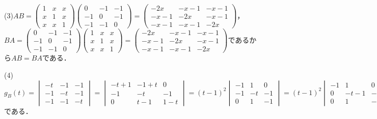 \documentclass[
		book,
		head_space=20mm,
		foot_space=20mm,
		gutter=10mm,
		line_length=190mm
]{jlreq}
\begin{document}
(3)$AB=\begin{pmatrix}
    1 & x & x \\
    x & 1 & x \\
    x & x & 1
\end{pmatrix}\begin{pmatrix}
    0 & -1 & -1 \\
    -1 & 0 & -1 \\
    -1 & -1 & 0
\end{pmatrix}= \begin{pmatrix}
    -2x & -x-1 & -x-1 \\
    -x-1 & -2x & -x-1 \\
    -x-1 & -x-1 & -2x
\end{pmatrix}$，$BA=\begin{pmatrix}
    0 & -1 & -1 \\
    -1 & 0 & -1 \\
    -1 & -1 & 0
\end{pmatrix}\begin{pmatrix}
    1 & x & x \\
    x & 1 & x \\
    x & x & 1
\end{pmatrix}= \begin{pmatrix}
    -2x & -x-1 & -x-1 \\
    -x-1 & -2x & -x-1 \\
    -x-1 & -x-1 & -2x
\end{pmatrix}$であるから$AB=BA$である．

(4)$g_B(t)=\begin{vmatrix}
    -t & -1 & -1 \\
    -1 & -t & -1 \\
    -1 & -1 & -t
    \end{vmatrix}=\begin{vmatrix}
        -t+1 & -1+t & 0 \\
        -1 & -t & -1 \\
        0 & t-1 & 1-t 
    \end{vmatrix}=(t-1)^2\begin{vmatrix}
        -1 & 1 & 0 \\
        -1 & -t & -1 \\
        0 & 1 & -1
    \end{vmatrix}=(t-1)^2\begin{vmatrix}
        -1 & 1 & 0 \\
        0 & -t-1 & -1 \\
        0 & 1 & -1
        \end{vmatrix}=-(t-1)^2\begin{vmatrix}
            -t-1 & -1 \\
            1 & -1
            \end{vmatrix}=-(t-1)^2(t+1+1)=-(t-1)^2(t+2)$である．
\end{document}
